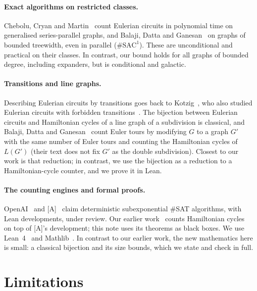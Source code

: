 \documentclass[10pt]{amsart}
\theoremstyle{plain}
\theoremstyle{definition}
\theoremstyle{remark}
\numberwithin{equation}{section}
\newcommand{\A}{\textup{[A]}}
\begin{document}
\paragraph{Exact algorithms on restricted classes.} Chebolu, Cryan and Martin~\cite{CCM12} count
Eulerian circuits in polynomial time on generalised series-parallel graphs, and Balaji, Datta and
Ganesan~\cite{BDG15} on graphs of bounded treewidth, even in parallel ($\#\mathrm{SAC}^1$). These are
unconditional and practical on their classes. In contrast, our bound holds for all graphs of bounded
degree, including expanders, but is conditional and galactic.

\paragraph{Transitions and line graphs.} Describing Eulerian circuits by transitions goes back to
Kotzig~\cite{Kot68}, who also studied Eulerian circuits with forbidden
transitions~\cite{Kot68b}. The bijection between Eulerian circuits and Hamiltonian cycles of a line
graph of a subdivision is classical, and Balaji, Datta and Ganesan~\cite{BDG15} count Euler tours by
modifying $G$ to a graph $G'$ with the same number of Euler tours and counting the Hamiltonian cycles of
$L(G')$ (their text does not fix $G'$ as the double subdivision). Closest to our work is that reduction; in contrast,
we use the bijection as a reduction to a Hamiltonian-cycle counter, and we prove it in Lean.

\paragraph{The counting engines and formal proofs.} OpenAI~\cite{OpenAI26} and \A~\cite{Anthropic26}
claim deterministic subexponential $\#$SAT algorithms, with Lean developments, under review. Our earlier
work~\cite{Tulsyan26} counts Hamiltonian cycles on top of \A's development; this note uses its
theorems as black boxes. We use Lean~4~\cite{Lean4} and Mathlib~\cite{Mathlib20}. In contrast to our
earlier work, the new mathematics here is small: a classical bijection and its size bounds, which we
state and check in full.

\section{Limitations}\label{sec:limitations}
\end{document}
